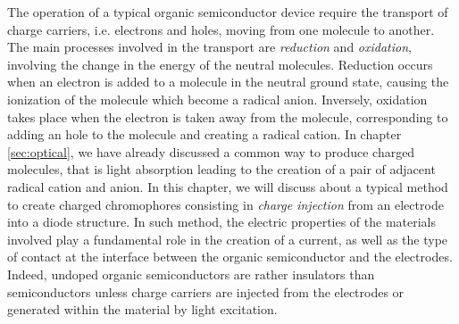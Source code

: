 \documentclass  [
  paper    = a4,
  BCOR     = 10mm,
  twoside,
  fontsize = 12pt,
  fleqn,
  toc      = bibnumbered,
  toc      = listofnumbered,
  numbers  = noendperiod,
  headings = normal,
  listof   = leveldown,
  version  = 3.03
]                                       {scrreprt}
\begin{document}
The operation of a typical organic semiconductor device require the transport of charge carriers, i.e. electrons and holes, moving from one molecule to another. The main processes involved in the transport are \emph{reduction} and \emph{oxidation}, involving the change in the energy of the neutral molecules. Reduction occurs when an electron is added to a molecule in the neutral ground state, causing the ionization of the molecule which become a radical anion. Inversely, oxidation takes place when the electron is taken away from the molecule, corresponding to adding an hole to the molecule and creating a radical cation. In chapter \ref{sec:optical}, we have already discussed a common way to produce charged molecules, that is light absorption leading to the creation of a pair of adjacent radical cation and anion. In this chapter, we will discuss about a typical method to create charged chromophores consisting in \emph{charge injection} from an electrode into a diode structure. In such method, the electric properties of the materials involved play a fundamental role in the creation of a current, as well as the type of contact at the interface between the organic semiconductor and the electrodes. Indeed, undoped organic semiconductors are rather insulators than semiconductors unless charge carriers are injected from the electrodes or generated within the material by light excitation.\\
\end{document}
